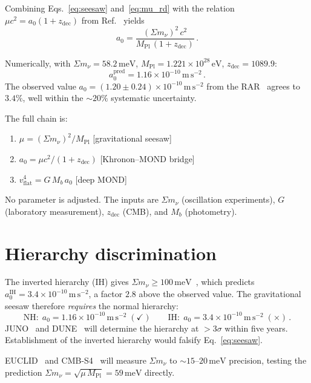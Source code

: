 \documentclass[prl,twocolumn,superscriptaddress,longbibliography]{revtex4-2}
\newcommand{\eV}{\,\mathrm{eV}}
\newcommand{\meV}{\,\mathrm{meV}}
\newcommand{\ms}{\,\mathrm{m\,s}^{-2}}
\newcommand{\zdec}{z_{\mathrm{dec}}}
\newcommand{\MPl}{M_{\mathrm{Pl}}}
\newcommand{\azero}{a_0}
\newcommand{\sumnu}{\Sigma m_\nu}
\begin{document}
Combining Eqs.~\eqref{eq:seesaw} and~\eqref{eq:mu_rd}
with the relation
$\mu c^2 = \azero(1+\zdec)$ from Ref.~\cite{PaperA0} yields
\begin{equation}\label{eq:chain}
  \boxed{\azero = \frac{(\sumnu)^2\,c^2}{\MPl\,(1+\zdec)}} \,.
\end{equation}

Numerically, with $\sumnu = 58.2\meV$, $\MPl = 1.221 \times 10^{28}\eV$,
$\zdec = 1089.9$:
\begin{equation}
  \azero^{\mathrm{pred}} = 1.16 \times 10^{-10}\ms \,.
\end{equation}
The observed value $\azero = (1.20 \pm 0.24) \times 10^{-10}\ms$
from the RAR~\cite{McGaugh2016} agrees to $3.4\%$, well within
the $\sim 20\%$ systematic uncertainty.

The full chain is:
\begin{enumerate}
  \item $\mu = (\sumnu)^2/\MPl$ \hfill [gravitational seesaw]
  \item $\azero = \mu c^2/(1+\zdec)$ \hfill [Khronon--MOND bridge]
  \item $v_{\mathrm{flat}}^4 = G\,M_b\,\azero$ \hfill [deep MOND]
\end{enumerate}
No parameter is adjusted. The inputs are $\sumnu$ (oscillation experiments),
$G$ (laboratory measurement), $\zdec$ (CMB), and $M_b$ (photometry).

\section{Hierarchy discrimination}

The inverted hierarchy (IH) gives $\sumnu \geq 100\meV$~\cite{NuFIT},
which predicts $\azero^{\mathrm{IH}} = 3.4 \times 10^{-10}\ms$,
a factor $2.8$ above the observed value.
The gravitational seesaw therefore \textit{requires} the normal hierarchy:
\begin{equation}
  \mathrm{NH:}\; \azero = 1.16 \times 10^{-10}\ms\;(\checkmark)
  \qquad
  \mathrm{IH:}\; \azero = 3.4 \times 10^{-10}\ms\;(\times) \,.
\end{equation}
JUNO~\cite{JUNO} and DUNE~\cite{DUNE} will determine the hierarchy
at $>3\sigma$ within five years.
Establishment of the inverted hierarchy would falsify
Eq.~\eqref{eq:seesaw}.

EUCLID~\cite{EUCLID} and CMB-S4~\cite{CMBS4} will measure
$\sumnu$ to $\sim 15$--$20\meV$ precision,
testing the prediction $\sumnu = \sqrt{\mu\,\MPl} = 59\meV$
directly.
\end{document}
